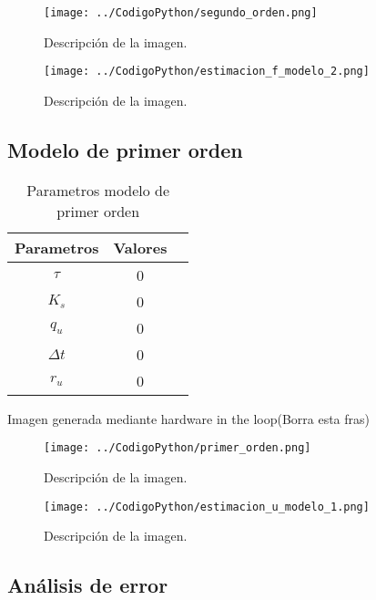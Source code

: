 \documentclass[conference]{IEEEtran}
\begin{document}
\begin{figure}[h]
	\centering
	\texttt{[image: ../CodigoPython/segundo\_orden.png]}
	\caption{Descripción de la imagen.}
	\label{fig:segundo_orden}
\end{figure}

\begin{figure}[h]
	\centering
	\texttt{[image: ../CodigoPython/estimacion\_f\_modelo\_2.png]}
	\caption{Descripción de la imagen.}
	\label{fig:f_modelo_2}
\end{figure}


\subsection{Modelo de primer orden}

\begin{table}[h]
	\centering
	\caption{Parametros modelo de primer orden}
	\label{tab:parametros_primer_orden}
	\begin{tabular}{|c|c|c|}
		\hline
		\textbf{Parametros} & \textbf{Valores} \\
		\hline
		$\tau$  &  0 \\
		$K_s$      & 0 \\
		$q_u$ & 0 \\
		$\Delta t$ & 0\\  
		$r_u$ & 0 \\ 
		\hline
	\end{tabular}
	
\end{table}

Imagen generada mediante hardware in the loop(Borra esta fras)


\begin{figure}[h]
	\centering
	\texttt{[image: ../CodigoPython/primer\_orden.png]}
	\caption{Descripción de la imagen.}
	\label{fig:primer_orden}
\end{figure}

\begin{figure}[h]
	\centering
	\texttt{[image: ../CodigoPython/estimacion\_u\_modelo\_1.png]}
	\caption{Descripción de la imagen.}
	\label{fig:u_modelo_1}
\end{figure}

\subsection{An\'alisis de error} 
\end{document}
